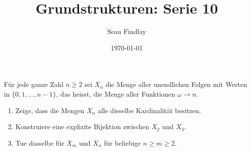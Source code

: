 \documentclass[12pt]{article}
\title{Grundstrukturen: Serie 10}
\author{Sean Findlay}
\date{\today}
\begin{document}
\maketitle

\begin{problem}{}{}
    Für jede ganze Zahl $n \geq 2$ sei $X_n$ die Menge aller unendlichen Folgen mit Werten in $\{0,1,\dots,n-1\}$, das heisst, die Menge aller Funktionen $\omega \rightarrow n$.

    \begin{enumerate}[label=\alph*)]
        \item Zeige, dass die Mengen $X_n$ alle dieselbe Kardinalität besitzen.
        \item Konstruiere eine explizite Bijektion zwischen $X_2$ und $X_3$.
        \item Tue dasselbe für $X_m$ und $X_n$ für beliebige $n \geq m \geq 2$.
    \end{enumerate}
\end{problem}
\end{document}
